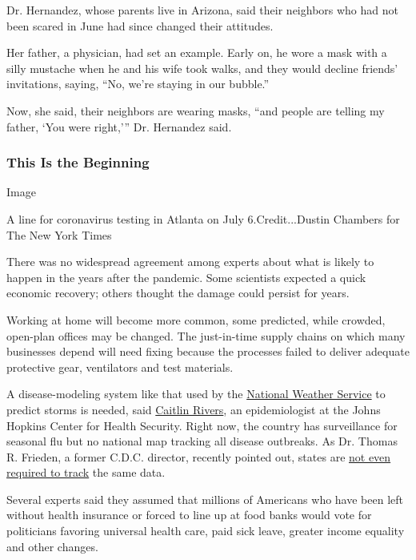 Dr. Hernandez, whose parents live in Arizona, said their neighbors who
had not been scared in June had since changed their attitudes.

Her father, a physician, had set an example. Early on, he wore a mask
with a silly mustache when he and his wife took walks, and they would
decline friends' invitations, saying, ``No, we're staying in our
bubble.''

Now, she said, their neighbors are wearing masks, ``and people are
telling my father, `You were right,''' Dr. Hernandez said.

\hypertarget{this-is-the-beginning}{%
\subsubsection{This Is the Beginning}\label{this-is-the-beginning}}

Image

A line for coronavirus testing in Atlanta on July 6.Credit...Dustin
Chambers for The New York Times

There was no widespread agreement among experts about what is likely to
happen in the years after the pandemic. Some scientists expected a quick
economic recovery; others thought the damage could persist for years.

Working at home will become more common, some predicted, while crowded,
open-plan offices may be changed. The just-in-time supply chains on
which many businesses depend will need fixing because the processes
failed to deliver adequate protective gear, ventilators and test
materials.

A disease-modeling system like that used by the
\href{https://www.weather.gov/}{National Weather Service} to predict
storms is needed, said
\href{https://www.centerforhealthsecurity.org/our-people/rivers/}{Caitlin
Rivers}, an epidemiologist at the Johns Hopkins Center for Health
Security. Right now, the country has surveillance for seasonal flu but
no national map tracking all disease outbreaks. As Dr. Thomas R.
Frieden, a former C.D.C. director, recently pointed out, states are
\href{https://www.nytimes.com/2020/07/21/health/coronavirus-data-states-cdc.html}{not
even required to track} the same data.

Several experts said they assumed that millions of Americans who have
been left without health insurance or forced to line up at food banks
would vote for politicians favoring universal health care, paid sick
leave, greater income equality and other changes.

